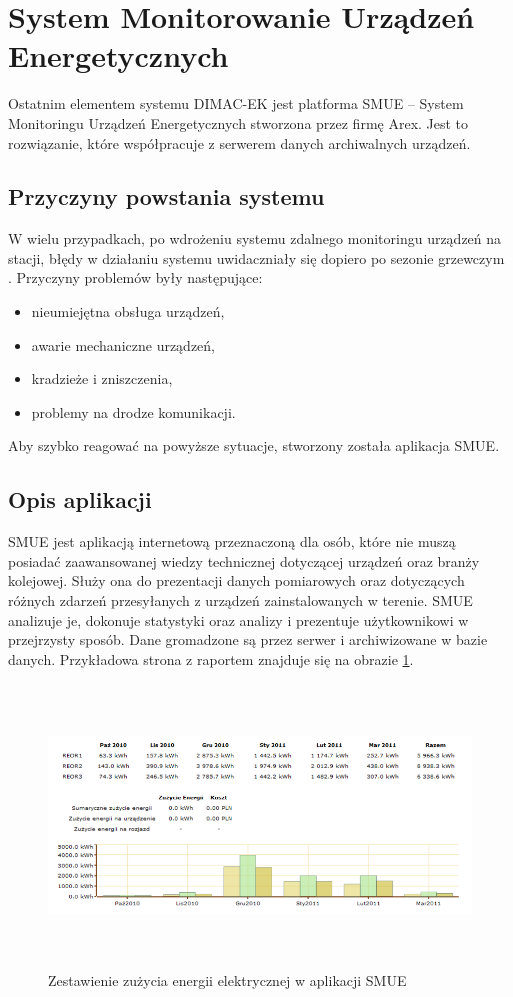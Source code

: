 \section{System Monitorowanie Urządzeń Energetycznych}
Ostatnim elementem systemu DIMAC-EK jest platforma SMUE -- System Monitoringu Urządzeń Energetycznych stworzona przez firmę Arex. Jest to rozwiązanie, które współpracuje z serwerem danych archiwalnych urządzeń\cite{dimacek-wytyczne}. 

\subsection{Przyczyny powstania systemu}
W wielu przypadkach, po wdrożeniu systemu zdalnego monitoringu urządzeń na stacji, błędy w działaniu systemu uwidaczniały się dopiero po sezonie grzewczym \cite{dimacek-wytyczne}. Przyczyny problemów były następujące:
\begin{itemize}
\item nieumiejętna obsługa urządzeń,
\item awarie mechaniczne urządzeń,
\item kradzieże i zniszczenia,
\item problemy na drodze komunikacji.
\end{itemize}

Aby szybko reagować na powyższe sytuacje, stworzony została aplikacja SMUE.

\subsection{Opis aplikacji}
SMUE jest aplikacją internetową przeznaczoną dla osób, które nie muszą posiadać zaawansowanej wiedzy technicznej dotyczącej urządzeń oraz branży kolejowej\cite{dimacek-wytyczne}. Służy ona do prezentacji danych pomiarowych oraz dotyczących różnych zdarzeń przesyłanych z urządzeń zainstalowanych w terenie. SMUE analizuje je, dokonuje statystyki oraz analizy i prezentuje użytkownikowi w przejrzysty sposób. Dane gromadzone są  przez serwer i archiwizowane w bazie danych. Przykładowa strona z raportem znajduje się na obrazie \ref{fig:smue}.\\

\begin{figure}[h]
		\centerline{\includegraphics[height=75mm]{./img/smue.png}}
		\caption{Zestawienie zużycia energii elektrycznej w aplikacji SMUE}
		\label{fig:smue}
\end{figure}

